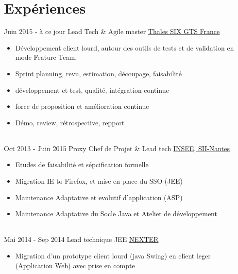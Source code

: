 \documentclass[letterpaper]{twentysecondcv} %
\begin{document}
\makeprofile %


\section{Expériences}

\begin{twenty} %
\twentyitem
    	{Juin 2015 -}
		{à ce jour}
        {Lead Tech \& Agile master}
        {\href{https://www.thalesgroup.com/fr}{Thales SIX GTS France}}
        {}
        {\begin{itemize} 		
      	\item Développement client lourd, autour des outils de tests et de validation en mode Feature Team.
        \item Sprint planning, revu, estimation, découpage, faisabilité
        \item développement et test, qualité, intégration continue
        \item force de proposition et amélioration continue
        \item Démo, review, rétrospective, repport
        \end{itemize}}
        \\
	\twentyitem
    	{Oct 2013 -}
		{Juin 2015}
        {Proxy Chef de Projet \& Lead tech}
        {\href{https://www.insee.fr/fr/accueil}{INSEE, SII-Nantes}}
        {}
        {
        {\begin{itemize}
		\item Etudes de faisabilité et sépcification formelle
		\item Migration IE to Firefox, et mise en place du SSO (JEE)
		\item Maintenance Adaptative et evolutif d'application (ASP)
		\item Maintenance Adaptative du Socle Java et Atelier de développement
    	\end{itemize}}
        }
    \\   
    \twentyitem
   		{Mai 2014 -}
		{Sep 2014}
        {Lead technique JEE}
        {\href{https://www.nexter-group.fr/}{NEXTER}}
        {}
        {
        {\begin{itemize}
     		\item Migration d'un prototype client lourd (java Swing) en client leger (Application Web) avec prise en compte

\end{itemize}}}
\end{twenty}
\end{document}
